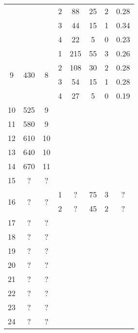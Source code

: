 \begin{longtable}[c]{|c|c|c|c|c|c|c|c|}
    & & & 2 & 88 & 25 & 2 & 0.28 \\\cline{4-8}
    & & & 3 & 44 & 15 & 1 & 0.34 \\\cline{4-8}
    & & & 4 & 22 & 5 & 0 & 0.23 \\\hline
    \multirow{4}{*}{9} & \multirow{4}{*}{430} & \multirow{4}{*}{8} & 1 & 215 & 55 & 3 & 0.26 \\\cline{4-8}
    & & & 2 & 108 & 30 & 2 & 0.28 \\\cline{4-8}
    & & & 3 & 54 & 15 & 1 & 0.28 \\\cline{4-8}
    & & & 4 & 27 & 5 & 0 & 0.19 \\\hline
    \multirow{1}{*}{10} & \multirow{1}{*}{525} & \multirow{1}{*}{9} & & & & & \\\hline
    \multirow{1}{*}{11} & \multirow{1}{*}{580} & \multirow{1}{*}{9} & & & & & \\\hline
    \multirow{1}{*}{12} & \multirow{1}{*}{610} & \multirow{1}{*}{10} & & & & & \\\hline
    \multirow{1}{*}{13} & \multirow{1}{*}{640} & \multirow{1}{*}{10} & & & & & \\\hline
    \multirow{1}{*}{14} & \multirow{1}{*}{670} & \multirow{1}{*}{11} & & & & & \\\hline
    \multirow{1}{*}{15} & \multirow{1}{*}{?} & \multirow{1}{*}{?} & & & & & \\\hline
    \multirow{2}{*}{16} & \multirow{2}{*}{?} & \multirow{2}{*}{?} & 1 & ? & 75 & 3 & ? \\\cline{4-8}
    & & & 2 & ? & 45 & 2 & ? \\\hline
    \multirow{1}{*}{17} & \multirow{1}{*}{?} & \multirow{1}{*}{?} & & & & & \\\hline
    \multirow{1}{*}{18} & \multirow{1}{*}{?} & \multirow{1}{*}{?} & & & & & \\\hline
    \multirow{1}{*}{19} & \multirow{1}{*}{?} & \multirow{1}{*}{?} & & & & & \\\hline
    \multirow{1}{*}{20} & \multirow{1}{*}{?} & \multirow{1}{*}{?} & & & & & \\\hline
    \multirow{1}{*}{21} & \multirow{1}{*}{?} & \multirow{1}{*}{?} & & & & & \\\hline
    \multirow{1}{*}{22} & \multirow{1}{*}{?} & \multirow{1}{*}{?} & & & & & \\\hline
    \multirow{1}{*}{23} & \multirow{1}{*}{?} & \multirow{1}{*}{?} & & & & & \\\hline
    \multirow{1}{*}{24} & \multirow{1}{*}{?} & \multirow{1}{*}{?} & & & & & \\\hline

\end{longtable}
